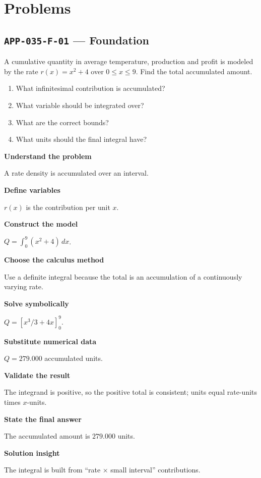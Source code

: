 \documentclass[11pt]{book}
\newcommand{\pid}[1]{\texttt{#1}}
\begin{document}
\section*{Problems}
\subsection*{\pid{APP-035-F-01} — Foundation}
\begin{problembox}
A cumulative quantity in average temperature, production and profit is modeled by the rate $r(x)=x^2+4$ over $0\le x\le 9$. Find the total accumulated amount.
\end{problembox}
\begin{promptbox}\begin{enumerate}
\item What infinitesimal contribution is accumulated?
\item What variable should be integrated over?
\item What are the correct bounds?
\item What units should the final integral have?
\end{enumerate}\end{promptbox}
\begin{solutionbox}
\textbf{Understand the problem}\par A rate density is accumulated over an interval.\par\medskip
\textbf{Define variables}\par $r(x)$ is the contribution per unit $x$.\par\medskip
\textbf{Construct the model}\par $Q=\int_0^{9}(x^2+4)\,dx$.\par\medskip
\textbf{Choose the calculus method}\par Use a definite integral because the total is an accumulation of a continuously varying rate.\par\medskip
\textbf{Solve symbolically}\par $Q=[x^3/3+4x]_0^{9}$.\par\medskip
\textbf{Substitute numerical data}\par $Q=279.000$ accumulated units.\par\medskip
\textbf{Validate the result}\par The integrand is positive, so the positive total is consistent; units equal rate-units times $x$-units.\par\medskip
\textbf{State the final answer}\par The accumulated amount is $279.000$ units.\par\medskip
\textbf{Solution insight}\par The integral is built from “rate × small interval” contributions.\par\medskip
\end{solutionbox}
\end{document}
